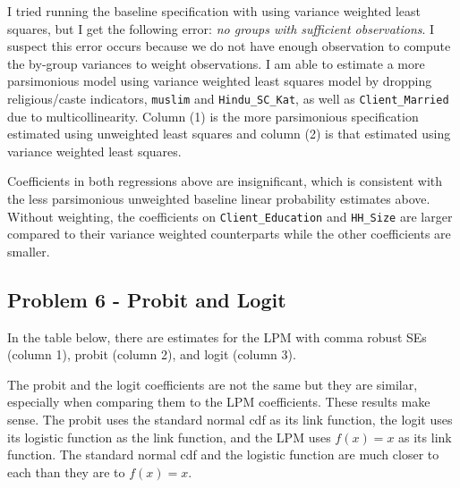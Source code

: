 \documentclass{article}
\begin{document}
I tried running the baseline specification with using variance weighted least squares, but I get the following error: \textit{no groups with sufficient observations}. I suspect this error occurs because we do not have enough observation to compute the by-group variances to weight observations.  I am able to estimate a more parsimonious model using variance weighted least squares model by dropping religious/caste indicators, \texttt{muslim} and \texttt{Hindu\_SC\_Kat}, as well as \texttt{Client\_Married} due to multicollinearity.  Column (1) is the more parsimonious specification estimated using unweighted least squares and column (2) is that estimated using variance weighted least squares.

\bigskip

\begin{center}

\end{center}

\bigskip

Coefficients in both regressions above are insignificant, which is consistent with the less parsimonious unweighted baseline linear probability estimates above.  Without weighting, the coefficients on \texttt{Client\_Education} and \texttt{HH\_Size} are larger compared to their variance weighted counterparts while the other coefficients are smaller.

\pagebreak

\subsection*{Problem 6 - Probit and Logit}

In the table below, there are estimates for the LPM with comma robust SEs (column 1), probit (column 2), and logit (column 3).

\bigskip

\begin{center}

\end{center}

\bigskip

The probit and the logit coefficients are not the same but they are similar, especially when comparing them to the LPM coefficients. These results make sense.  The probit uses the standard normal cdf as its link function, the logit uses its logistic function as the link function, and the LPM uses $f(x)=x$ as its link function.  The standard normal cdf and the logistic function are much closer to each than they are to $f(x)=x$.
\end{document}
